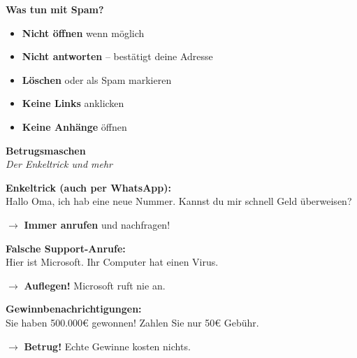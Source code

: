 \documentclass[a4paper,landscape,8pt]{extarticle}
\begin{document}
\begin{minipage}[t]{0.32\linewidth}
\textbf{Was tun mit Spam?}
\begin{itemize}
\item \textbf{Nicht öffnen} wenn möglich
\item \textbf{Nicht antworten} -- bestätigt deine Adresse
\item \textbf{Löschen} oder als Spam markieren
\item \textbf{Keine Links} anklicken
\item \textbf{Keine Anhänge} öffnen
\end{itemize}

\end{minipage}%
\hfill%
\begin{minipage}[t]{0.32\linewidth}
\begin{center}
\colorbox{scampurple!10}{%
\begin{minipage}{0.95\linewidth}
\vspace{2mm}
\begin{center}
{\Large\bfseries\textcolor{scampurple}{Betrugsmaschen}}\\[1pt]
{\footnotesize\itshape Der Enkeltrick und mehr}
\end{center}
\vspace{2mm}
\end{minipage}%
}
\end{center}

\vspace{1mm}

\textbf{Enkeltrick (auch per WhatsApp):}\\
\glqq Hallo Oma, ich hab eine neue Nummer. Kannst du mir schnell Geld überweisen?\grqq{}

$\rightarrow$ \textbf{Immer anrufen} und nachfragen!

\vspace{2mm}

\textbf{Falsche Support-Anrufe:}\\
\glqq Hier ist Microsoft. Ihr Computer hat einen Virus.\grqq{}

$\rightarrow$ \textbf{Auflegen!} Microsoft ruft nie an.

\vspace{2mm}

\textbf{Gewinnbenachrichtigungen:}\\
\glqq Sie haben 500.000€ gewonnen! Zahlen Sie nur 50€ Gebühr.\grqq{}

$\rightarrow$ \textbf{Betrug!} Echte Gewinne kosten nichts.

\vspace{2mm}


\end{minipage}
\end{document}

